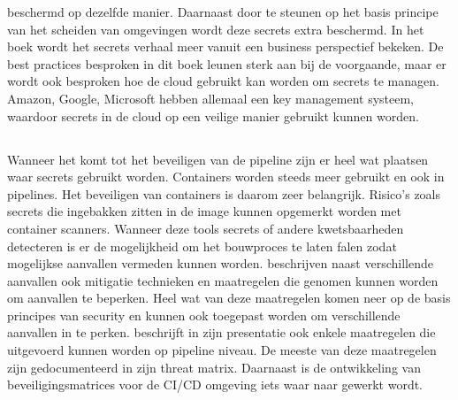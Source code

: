 beschermd op dezelfde manier. Daarnaast door te steunen op het basis principe van het scheiden van omgevingen wordt deze secrets extra beschermd.\autocite{Basak2022} In het  boek \textcite{Calles2020} wordt het secrets verhaal meer vanuit een business perspectief bekeken. De best practices besproken in dit boek leunen sterk aan bij de voorgaande, maar er wordt ook besproken hoe de cloud gebruikt kan worden om secrets te managen. Amazon, Google, Microsoft hebben allemaal een key management systeem, waardoor secrets in de cloud op een veilige manier gebruikt kunnen worden.

\subsection{}%
\label{sec:Beveiligen van de pipeline}
Wanneer het komt tot het beveiligen van de pipeline zijn er heel wat plaatsen waar secrets gebruikt worden. Containers worden steeds meer gebruikt en ook in pipelines. Het beveiligen van containers is daarom zeer belangrijk. Risico's zoals secrets die ingebakken zitten in de image kunnen opgemerkt worden met container scanners. Wanneer deze tools secrets of andere kwetsbaarheden detecteren is er de mogelijkheid om het bouwproces te laten falen zodat mogelijkse aanvallen vermeden kunnen worden.\autocite{Agarwal2021} \textcite{Security2022} beschrijven naast verschillende aanvallen ook mitigatie technieken en maatregelen die genomen kunnen worden om aanvallen te beperken. Heel wat van deze maatregelen komen neer op de basis principes van security en kunnen ook toegepast worden om verschillende aanvallen in te perken.\textcite{Suezawa2021} beschrijft in zijn presentatie ook enkele maatregelen die uitgevoerd kunnen worden op pipeline niveau. De meeste van deze maatregelen zijn gedocumenteerd in zijn threat matrix. Daarnaast is de ontwikkeling van beveiligingsmatrices voor de CI/CD omgeving iets waar naar gewerkt wordt.  

